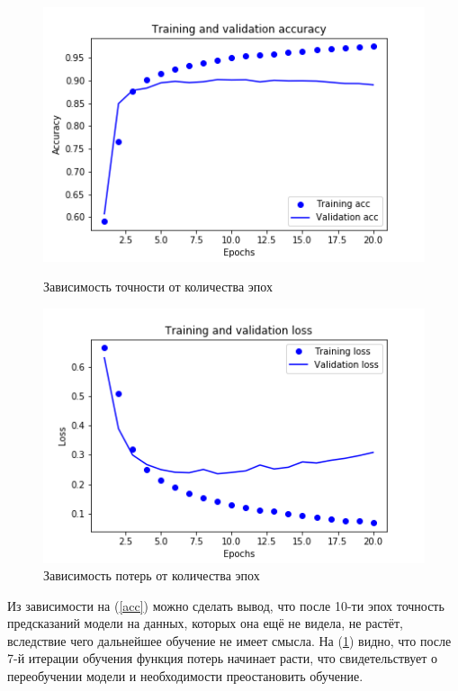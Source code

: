 \documentclass[14pt]{matmex-diploma}
\begin{document}
        \begin{figure}[!htb]
           \begin{minipage}{0.48\textwidth}
             \centering
             \includegraphics[width=.9\linewidth]{images/acc.png}
             \caption{Зависимость точности от количества эпох}\label{acc}
           \end{minipage}\hfill
           \begin{minipage}{0.48\textwidth}
             \centering
             \includegraphics[width=.9\linewidth]{images/loss.png}
             \caption{Зависимость потерь от количества эпох}\label{loss}
           \end{minipage}
        \end{figure}
        
        Из зависимости на (\ref{acc}) можно сделать вывод, что после 10-ти эпох точность предсказаний модели на данных, которых
        она ещё не видела, не растёт, вследствие чего дальнейшее обучение не имеет смысла. На (\ref{loss}) видно, что после 7-й 
        итерации обучения функция потерь начинает расти, что свидетельствует о переобучении модели и необходимости 
        преостановить обучение.
\end{document}
